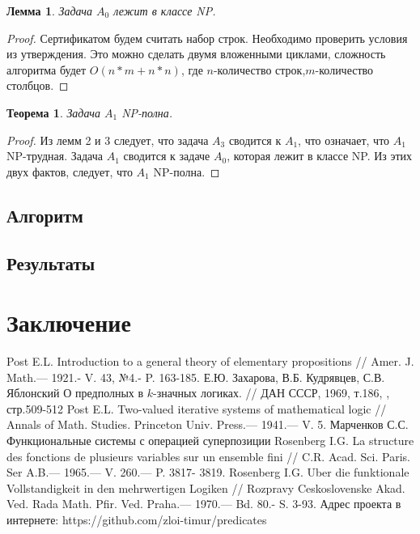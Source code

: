 \documentclass[a4paper,14pt]{extreport}
\newtheorem{thm}{Теорема}
\newtheorem{lm}{Лемма}
\begin{document}
\begin{lm}
Задача $A_0$ лежит в классе NP.
\end{lm}
\begin{proof}
Сертификатом будем считать набор строк. Необходимо проверить условия из утверждения. Это можно сделать двумя вложенными циклами, сложность алгоритма будет $O(n*m+n*n)$, где $n$-количество строк,$m$-количество столбцов.
\end{proof}

\begin{thm}
Задача $A_1$ NP-полна.
\end{thm}
\begin{proof}
Из лемм 2 и 3 следует, что задача $A_3$ сводится к $A_1$, что означает, что $A_1$ NP-трудная. Задача $A_1$ сводится к задаче $A_0$, которая лежит в классе NP. Из этих двух фактов, следует, что $A_1$ NP-полна.  
\end{proof}
\section{Алгоритм}
\section{Результаты}


\chapter{Заключение}



\newpage
{}
\begin{thebibliography}{9}
	Post E.L. Introduction to a general theory of elementary propositions // 
Amer. J. Math.— 1921.- V. 43, №4.- P. 163-185. 
 Е.Ю. Захарова, В.Б. Кудрявцев, С.В. Яблонский О предполных в $k$-значных логиках. // ДАН СССР, 1969, т.186, , стр.509-512 
	Post E.L. Two-valued iterative systems of mathematical logic // Annals of 
Math. Studies. Princeton Univ. Press.— 1941.— V. 5. 
 Марченков С.С. Функциональные системы с операцией суперпозиции
	Rosenberg I.G. La structure des fonctions de plusieurs variables sur un ensemble fini // C.R. Acad. Sci. Paris. Ser A.B.— 1965.— V. 260.— P. 3817- 3819. 
	Rosenberg I.G. Uber die funktionale Vollstandigkeit in den mehrwertigen Logiken // Rozpravy Ceskoslovenske Akad. Ved. Rada Math. Pfir. Ved. Praha.— 1970.— Bd. 80.- S. 3-93. 
 Адрес проекта в интернете: https://github.com/zloi-timur/predicates 


\end{thebibliography}
\end{document}
